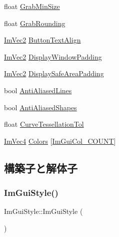 \begin{DoxyCompactItemize}
\item 
float \mbox{\hyperlink{struct_im_gui_style_a04db033d001b343815cdcd2491576ef7}{Grab\+Min\+Size}}
\item 
float \mbox{\hyperlink{struct_im_gui_style_a42369d83032545066803a7db62936e8f}{Grab\+Rounding}}
\item 
\mbox{\hyperlink{struct_im_vec2}{Im\+Vec2}} \mbox{\hyperlink{struct_im_gui_style_a17246b12f4e069229d21808a87f78514}{Button\+Text\+Align}}
\item 
\mbox{\hyperlink{struct_im_vec2}{Im\+Vec2}} \mbox{\hyperlink{struct_im_gui_style_ab06d6f0c6c5f36ab0c14688448de66f6}{Display\+Window\+Padding}}
\item 
\mbox{\hyperlink{struct_im_vec2}{Im\+Vec2}} \mbox{\hyperlink{struct_im_gui_style_a8dd02a6a031ec8667e76aab1e28755bd}{Display\+Safe\+Area\+Padding}}
\item 
bool \mbox{\hyperlink{struct_im_gui_style_a0164b54454297971d40f3578b2c1ffeb}{Anti\+Aliased\+Lines}}
\item 
bool \mbox{\hyperlink{struct_im_gui_style_ae3c6b2f226fe51631352a637f3defabb}{Anti\+Aliased\+Shapes}}
\item 
float \mbox{\hyperlink{struct_im_gui_style_a41eb9377b63b8b85ab807c28e00198e9}{Curve\+Tessellation\+Tol}}
\item 
\mbox{\hyperlink{struct_im_vec4}{Im\+Vec4}} \mbox{\hyperlink{struct_im_gui_style_a2b4941240a38d1300c39a7fa4f03d0a3}{Colors}} \mbox{[}\mbox{\hyperlink{imgui_8h_a8e46ef7d0c76fbb1916171edfa4ae9e7ac911e17bec14cc3339cf3901a197628b}{Im\+Gui\+Col\+\_\+\+C\+O\+U\+NT}}\mbox{]}
\end{DoxyCompactItemize}


\subsection{構築子と解体子}
\mbox{\label{struct_im_gui_style_ab0a3ffb3aeec3e6b09b9bde812b28369}} 
\subsubsection{\texorpdfstring{Im\+Gui\+Style()}{ImGuiStyle()}}
{\footnotesize\ttfamily Im\+Gui\+Style\+::\+Im\+Gui\+Style (\begin{DoxyParamCaption}{ }\end{DoxyParamCaption})}



